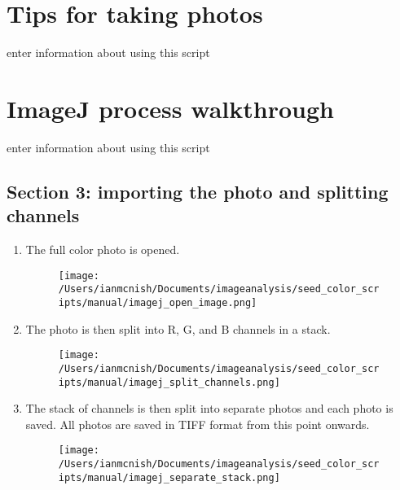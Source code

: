 \documentclass[12pt]{article}
\begin{document}
\section{Tips for taking photos}\label{sec:photos}

enter information about using this script

\section{ImageJ process walkthrough}\label{sec:imagej_process}

enter information about using this script

\subsection{Section 3: importing the photo and splitting channels}\label{sec:imagej_import_split}

\begin{enumerate}

\item The full color photo is opened.\\

\begin{figure}[H]
	\centering
	\texttt{[image: /Users/ianmcnish/Documents/imageanalysis/seed\_color\_scripts/manual/imagej\_open\_image.png]}
	\label{fig:imagej_open_image}
\end{figure}

\item The photo is then split into R, G, and B channels in a stack.\\

\begin{figure}[H]
	\centering
	\texttt{[image: /Users/ianmcnish/Documents/imageanalysis/seed\_color\_scripts/manual/imagej\_split\_channels.png]}
	\label{fig:imagej_split_channels}
\end{figure}

\item The stack of channels is then split into separate photos and each photo is saved. All photos are saved in TIFF format from this point onwards.\\

\begin{figure}[H]
	\centering
	\texttt{[image: /Users/ianmcnish/Documents/imageanalysis/seed\_color\_scripts/manual/imagej\_separate\_stack.png]}
	\label{fig:imagej_separate_stack}
\end{figure}

\end{enumerate}
\end{document}

